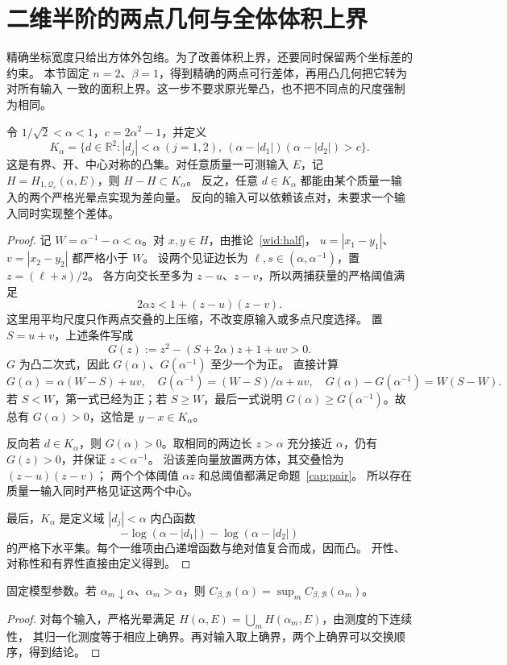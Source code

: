 \section{二维半阶的两点几何与全体体积上界}\label{pb:section}

精确坐标宽度只给出方体外包络。为了改善体积上界，还要同时保留两个坐标差的约束。
本节固定 $n=2$、$\beta=1$，得到精确的两点可行差体，再用凸几何把它转为对所有输入
一致的面积上界。这一步不要求原光晕凸，也不把不同点的尺度强制为相同。

\begin{theorem}[严格两点可行差体]\label{pb:body}
令 $1/\sqrt2<\alpha<1$，$c=2\alpha^2-1$，并定义
\[
 K_\alpha=\{d\in\mathbb R^2:|d_j|<\alpha\ (j=1,2),\
 (\alpha-|d_1|)(\alpha-|d_2|)>c\}.
\]
这是有界、开、中心对称的凸集。对任意质量一可测输入 $E$，记
$H=H_{1,\mathcal Q_c}(\alpha,E)$，则 $H-H\subset K_\alpha$。
反之，任意 $d\in K_\alpha$ 都能由某个质量一输入的两个严格光晕点实现为差向量。
反向的输入可以依赖该点对，未要求一个输入同时实现整个差体。
\end{theorem}
\begin{proof}
记 $W=\alpha^{-1}-\alpha<\alpha$。对 $x,y\in H$，由推论~\ref{wid:half}，
$u=|x_1-y_1|$、$v=|x_2-y_2|$ 都严格小于 $W$。
设两个见证边长为 $\ell,s\in(\alpha,\alpha^{-1})$，置 $z=(\ell+s)/2$。
各方向交长至多为 $z-u$、$z-v$，所以两捕获量的严格阈值满足
\[
 2\alpha z<1+(z-u)(z-v).
\]
这里用平均尺度只作两点交叠的上压缩，不改变原输入或多点尺度选择。
置 $S=u+v$，上述条件写成
\[
 G(z):=z^2-(S+2\alpha)z+1+uv>0.
\]
$G$ 为凸二次式，因此 $G(\alpha)$、$G(\alpha^{-1})$ 至少一个为正。
直接计算
\[
 G(\alpha)=\alpha(W-S)+uv,\quad
 G(\alpha^{-1})=(W-S)/\alpha+uv,\quad
 G(\alpha)-G(\alpha^{-1})=W(S-W).
\]
若 $S<W$，第一式已经为正；若 $S\ge W$，最后一式说明
$G(\alpha)\ge G(\alpha^{-1})$。故总有 $G(\alpha)>0$，这恰是 $y-x\in K_\alpha$。

反向若 $d\in K_\alpha$，则 $G(\alpha)>0$。取相同的两边长 $z>\alpha$
充分接近 $\alpha$，仍有 $G(z)>0$，并保证 $z<\alpha^{-1}$。
沿该差向量放置两方体，其交叠恰为 $(z-u)(z-v)$；
两个个体阈值 $\alpha z$ 和总阈值都满足命题~\ref{cap:pair}。
所以存在质量一输入同时严格见证这两个中心。

最后，$K_\alpha$ 是定义域 $|d_j|<\alpha$ 内凸函数
\[
 -\log(\alpha-|d_1|)-\log(\alpha-|d_2|)
\]
的严格下水平集。每个一维项由凸递增函数与绝对值复合而成，因而凸。
开性、对称性和有界性直接由定义得到。
\end{proof}

\begin{lemma}[严格水平常数的右连续性]\label{pb:right-continuity}
固定模型参数。若 $\alpha_m\downarrow\alpha$、$\alpha_m>\alpha$，则
$C_{\beta,\mathcal B}(\alpha)=\sup_m C_{\beta,\mathcal B}(\alpha_m)$。
\end{lemma}
\begin{proof}
对每个输入，严格光晕满足
$H(\alpha,E)=\bigcup_mH(\alpha_m,E)$，由测度的下连续性，
其归一化测度等于相应上确界。再对输入取上确界，两个上确界可以交换顺序，得到结论。
\end{proof}

